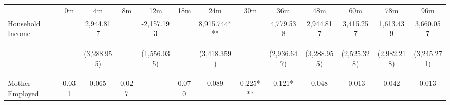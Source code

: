 \begin{tabular}{lcccccccccccc}
\hline \noalign{\smallskip} & 0m & 4m & 8m & 12m & 18m & 24m & 30m & 36m & 48m & 60m & 78m & 96m\\
\noalign{\smallskip}\hline \noalign{\smallskip}Household Income &  & 2,944.817 &  & -2,157.193 &  & 8,915.744*** &  & 4,779.538 & 2,944.817 & 3,415.257 & 1,613.439 & 3,660.057\\
 & \begin{footnotesize}\end{footnotesize} & \begin{footnotesize}(3,288.955)\end{footnotesize} & \begin{footnotesize}\end{footnotesize} & \begin{footnotesize}(1,556.035)\end{footnotesize} & \begin{footnotesize}\end{footnotesize} & \begin{footnotesize}(3,418.359)\end{footnotesize} & \begin{footnotesize}\end{footnotesize} & \begin{footnotesize}(2,936.647)\end{footnotesize} & \begin{footnotesize}(3,288.955)\end{footnotesize} & \begin{footnotesize}(2,525.328)\end{footnotesize} & \begin{footnotesize}(2,982.218)\end{footnotesize} & \begin{footnotesize}(3,245.271)\end{footnotesize}\\
\noalign{\smallskip}Mother Employed & 0.031 & 0.065 & 0.027 &  & 0.070 & 0.089 & 0.225*** & 0.121* & 0.048 & -0.013 & 0.042 & 0.013\\

\end{tabular}
